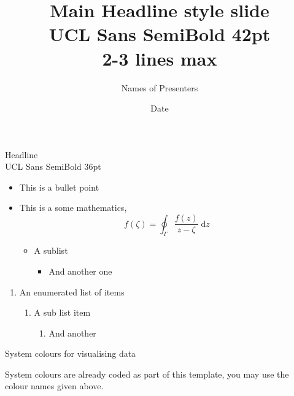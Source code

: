 \documentclass[aspectratio=169]{beamer}
\title{Main Headline style slide\\UCL Sans SemiBold 42pt\\2-3 lines max}
\author{Names of Presenters}
\institute{Type in your faculty/department/unit}
\date{Date}
\begin{document}
\maketitle

\begin{frame}{Headline\\UCL Sans SemiBold 36pt}

    \begin{itemize}
        \item This is a bullet point
        \item This is a some \alert{mathematics},
        \[ f(\zeta) = \oint_\Gamma \frac{f(z)}{z-\zeta} \;\text{d}z\]
        \begin{itemize}
            \item A sublist
            \begin{itemize}
                \item And another one
            \end{itemize}
        \end{itemize}
    \end{itemize}

\end{frame}

\begin{frame}

    \begin{enumerate}
        \item An enumerated list of items
        \begin{enumerate}
            \item A sub list item
            \begin{enumerate}
                \item And another
            \end{enumerate}
        \end{enumerate}
    \end{enumerate}

\end{frame}

\begin{frame}[t]{System colours for visualising data}
    System colours are already coded as part of this template, you may use the colour names given above.
\end{frame}
\end{document}
